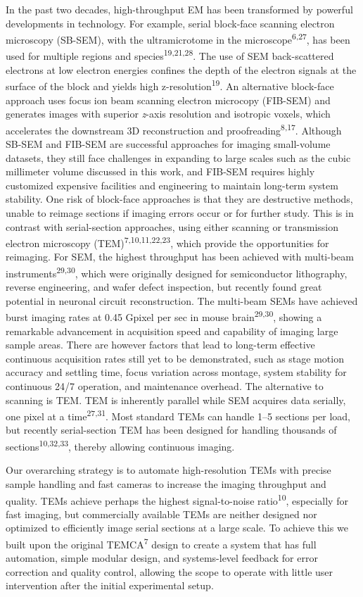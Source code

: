 \documentclass{article}
\begin{document}
In the past two decades, high-throughput EM has been transformed by powerful developments in technology. For example, serial block-face scanning electron microscopy (SB-SEM), with the ultramicrotome in the microscope\textsuperscript{6,27}, has been used for multiple regions and species\textsuperscript{19,21,28}. The use of SEM back-scattered electrons at low electron energies confines the depth of the electron signals at the surface of the block and yields high z-resolution\textsuperscript{19}. An alternative block-face approach uses focus ion beam scanning electron microcopy (FIB-SEM) and generates images with superior \emph{z}-axis resolution and isotropic voxels, which accelerates the downstream 3D reconstruction and proofreading\textsuperscript{8,17}. Although SB-SEM and FIB-SEM are successful approaches for imaging small-volume datasets, they still face challenges in expanding to large scales such as the cubic millimeter volume discussed in this work, and FIB-SEM requires highly customized expensive facilities and engineering to maintain long-term system stability. One risk of block-face approaches is that they are destructive methods, unable to reimage sections if imaging errors occur or for further study. This is in contrast with serial-section approaches, using either scanning or transmission electron microscopy (TEM)\textsuperscript{7,10,11,22,23}, which provide the opportunities for reimaging. For SEM, the highest throughput has been achieved with multi-beam instruments\textsuperscript{29,30}, which were originally designed for semiconductor lithography, reverse engineering, and wafer defect inspection, but recently found great potential in neuronal circuit reconstruction. The multi-beam SEMs have achieved burst imaging rates at 0.45 Gpixel per sec in mouse brain\textsuperscript{29,30}, showing a remarkable advancement in acquisition speed and capability of imaging large sample areas. There are however factors that lead to long-term effective continuous acquisition rates still yet to be demonstrated, such as stage motion accuracy and settling time, focus variation across montage, system stability for continuous 24/7 operation, and maintenance overhead. The alternative to scanning is TEM. TEM is inherently parallel while SEM acquires data serially, one pixel at a time\textsuperscript{27,31}. Most standard TEMs can handle 1–5 sections per load, but recently serial-section TEM has been designed for handling thousands of sections\textsuperscript{10,32,33}, thereby allowing continuous imaging.

Our overarching strategy is to automate high-resolution TEMs with precise sample handling and fast cameras to increase the imaging throughput and quality. TEMs achieve perhaps the highest signal-to-noise ratio\textsuperscript{10}, especially for fast imaging, but commercially available TEMs are neither designed nor optimized to efficiently image serial sections at a large scale. To achieve this we built upon the original TEMCA\textsuperscript{7} design to create a system that has full automation, simple modular design, and systems-level feedback for error correction and quality control, allowing the scope to operate with little user intervention after the initial experimental setup.
\end{document}
